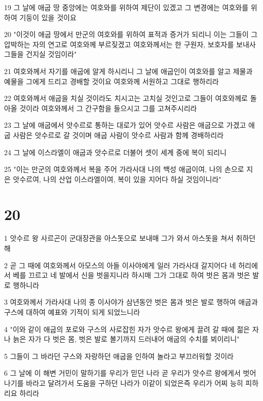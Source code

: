 \par 19 그 날에 애굽 땅 중앙에는 여호와를 위하여 제단이 있겠고 그 변경에는 여호와를 위하여 기둥이 있을 것이요
\par 20 "이것이 애굽 땅에서 만군의 여호와를 위하여 표적과 증거가 되리니 이는 그들이 그 압박하는 자의 연고로 여호와께 부르짖겠고 여호와께서는 한 구원자, 보호자를 보내사 그들을 건지실 것임이라"
\par 21 여호와께서 자기를 애굽에 알게 하시리니 그 날에 애굽인이 여호와를 알고 제물과 예물을 그에게 드리고 경배할 것이요 여호와께 서원하고 그대로 행하리라
\par 22 여호와께서 애굽을 치실 것이라도 치시고는 고치실 것인고로 그들이 여호와께로 돌아올 것이라 여호와께서 그 간구함을 들으시고 그를 고쳐주시리라
\par 23 그 날에 애굽에서 앗수르로 통하는 대로가 있어 앗수르 사람은 애굽으로 가겠고 애굽 사람은 앗수르로 갈 것이며 애굽 사람이 앗수르 사람과 함께 경배하리라
\par 24 그 날에 이스라엘이 애굽과 앗수르로 더불어 셋이 세계 중에 복이 되리니
\par 25 "이는 만군의 여호와께서 복을 주어 가라사대 나의 백성 애굽이여, 나의 손으로 지은 앗수르여, 나의 산업 이스라엘이여, 복이 있을 지어다 하실 것임이니라"

\chapter{20}

\par 1 앗수르 왕 사르곤이 군대장관을 아스돗으로 보내매 그가 와서 아스돗을 쳐서 취하던 해
\par 2 곧 그 때에 여호와께서 아모스의 아들 이사야에게 일러 가라사대 갈지어다 네 허리에서 베를 끄르고 네 발에서 신을 벗을지니라 하시매 그가 그대로 하여 벗은 몸과 벗은 발로 행하니라
\par 3 여호와께서 가라사대 나의 종 이사야가 삼년동안 벗은 몸과 벗은 발로 행하여 애굽과 구스에 대하여 예표와 기적이 되게 되었느니라
\par 4 "이와 같이 애굽의 포로와 구스의 사로잡힌 자가 앗수르 왕에게 끌려 갈 때에 젊은 자나 늙은 자가 다 벗은 몸, 벗은 발로 볼기까지 드러내어 애굽의 수치를 뵈이리니"
\par 5 그들이 그 바라던 구스와 자랑하던 애굽을 인하여 놀라고 부끄러워할 것이라
\par 6 그 날에 이 해변 거민이 말하기를 우리가 믿던 나라 곧 우리가 앗수르 왕에게서 벗어나기를 바라고 달려가서 도움을 구하던 나라가 이같이 되었은즉 우리가 어찌 능히 피하리요 하리라

